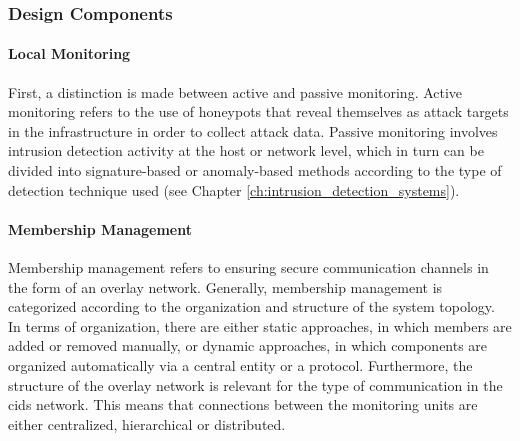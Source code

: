 \subsubsection{Design Components}\label{ch:design_components}

\paragraph{Local Monitoring} \label{par:local_monitoring} First, a distinction is made between active and passive monitoring. Active monitoring refers to the use of honeypots that reveal themselves as attack targets in the infrastructure in order to collect attack data. Passive monitoring involves intrusion detection activity at the host or network level, which in turn can be divided into signature-based or anomaly-based methods according to the type of detection technique used (see Chapter \ref{ch:intrusion_detection_systems}). 

\paragraph{Membership Management}\label{par:membership_management} Membership management refers to ensuring secure communication channels in the form of an overlay network. Generally, membership management is categorized according to the organization and structure of the system topology. In terms of organization, there are either static approaches, in which members are added or removed manually, or dynamic approaches, in which components are organized automatically via a central entity or a protocol. Furthermore, the structure of the overlay network is relevant for the type of communication in the \acrshort{cids} network. This means that connections between the monitoring units are either centralized, hierarchical or distributed. 


